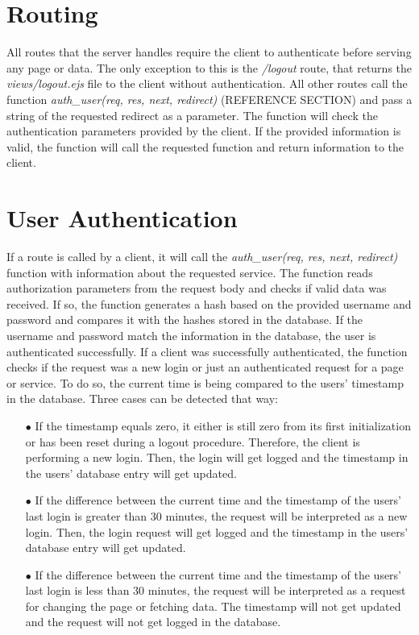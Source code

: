 \section{Routing}
All routes that the server handles require the client to authenticate before serving any page or data. The only exception to this is the \textit{/logout} route, that returns the \textit{views/logout.ejs} file to the client without authentication. All other routes call the function \textit{auth\_user(req, res, next, redirect)} (REFERENCE SECTION) and pass a string of the requested redirect as a parameter. The function will check the authentication parameters provided by the client. If the provided information is valid, the function will call the requested function and return information to the client.


\section{User Authentication}
If a route is called by a client, it will call the \textit{auth\_user(req, res, next, redirect)} function with information about the requested service.  The function reads authorization parameters from the request body and checks if valid data was received. If so, the function generates a hash based on the provided username and password and compares it with the hashes stored in the database. If the username and password match the information in the database, the user is authenticated successfully.
If a client was successfully authenticated, the function checks if the request was a new login or just an authenticated request for a page or service.  To do so, the current time is being compared to the users' timestamp in the database. Three cases can be detected that way:

\begin{itemize}
  \item[$\bullet$] If the timestamp equals zero, it either is still zero from its first initialization or has been reset during a logout procedure. Therefore, the client is performing a new login. Then, the login will get logged and the timestamp in the users' database entry will get updated.
  \item[$\bullet$] If the difference between the current time and the timestamp of the users' last login is greater than 30 minutes, the request will be interpreted as a new login.  Then, the login request will get logged and the timestamp in the users' database entry will get updated.
  \item[$\bullet$]  If the difference between the current time and the timestamp of the users' last login is less than 30 minutes, the request will be interpreted as a request for changing the page or fetching data. The timestamp will not get updated and the request will not get logged in the database.
\end{itemize}

